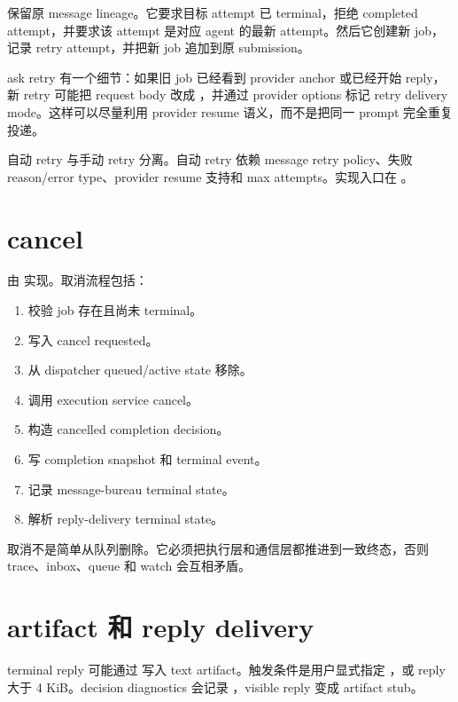  保留原 message lineage。它要求目标 attempt 已 terminal，拒绝 completed attempt，并要求该 attempt 是对应 agent 的最新 attempt。然后它创建新 job，记录 retry attempt，并把新 job 追加到原 submission。

ask retry 有一个细节：如果旧 job 已经看到 provider anchor 或已经开始 reply，新 retry 可能把 request body 改成 ，并通过 provider options 标记 retry delivery mode。这样可以尽量利用 provider resume 语义，而不是把同一 prompt 完全重复投递。

自动 retry 与手动 retry 分离。自动 retry 依赖 message retry policy、失败 reason/error type、provider resume 支持和 max attempts。实现入口在 。

\section{cancel}

 由  实现。取消流程包括：

\begin{enumerate}
  \item 校验 job 存在且尚未 terminal。
  \item 写入 cancel requested。
  \item 从 dispatcher queued/active state 移除。
  \item 调用 execution service cancel。
  \item 构造 cancelled completion decision。
  \item 写 completion snapshot 和 terminal event。
  \item 记录 message-bureau terminal state。
  \item 解析 reply-delivery terminal state。
\end{enumerate}

取消不是简单从队列删除。它必须把执行层和通信层都推进到一致终态，否则 trace、inbox、queue 和 watch 会互相矛盾。

\section{artifact 和 reply delivery}

terminal reply 可能通过  写入 text artifact。触发条件是用户显式指定 ，或 reply 大于 4 KiB。decision diagnostics 会记录 ，visible reply 变成 artifact stub。

